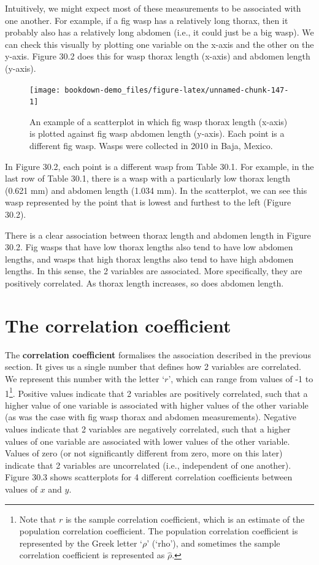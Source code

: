 \documentclass[
]{scrbook}
\begin{document}
Intuitively, we might expect most of these measurements to be associated with one another.
For example, if a fig wasp has a relatively long thorax, then it probably also has a relatively long abdomen (i.e., it could just be a big wasp).
We can check this visually by plotting one variable on the x-axis and the other on the y-axis.
Figure 30.2 does this for wasp thorax length (x-axis) and abdomen length (y-axis).

\begin{figure}
\texttt{[image: bookdown-demo\_files/figure-latex/unnamed-chunk-147-1]} \caption{An example of a scatterplot in which fig wasp thorax length (x-axis) is plotted against fig wasp abdomen length (y-axis). Each point is a different fig wasp. Wasps were collected in 2010 in Baja, Mexico.}\label{fig:unnamed-chunk-147}
\end{figure}

In Figure 30.2, each point is a different wasp from Table 30.1.
For example, in the last row of Table 30.1, there is a wasp with a particularly low thorax length (0.621 mm) and abdomen length (1.034 mm).
In the scatterplot, we can see this wasp represented by the point that is lowest and furthest to the left (Figure 30.2).

There is a clear association between thorax length and abdomen length in Figure 30.2.
Fig wasps that have low thorax lengths also tend to have low abdomen lengths, and wasps that high thorax lengths also tend to have high abdomen lengths.
In this sense, the 2 variables are associated.
More specifically, they are positively correlated.
As thorax length increases, so does abdomen length.

\hypertarget{the-correlation-coefficient}{%
\section{The correlation coefficient}\label{the-correlation-coefficient}}

The \textbf{correlation coefficient} formalises the association described in the previous section.
It gives us a single number that defines how 2 variables are correlated.
We represent this number with the letter `\(r\)', which can range from values of -1 to 1\footnote{Note that \(r\) is the sample correlation coefficient, which is an estimate of the population correlation coefficient. The population correlation coefficient is represented by the Greek letter `\(\rho\)' (`rho'), and sometimes the sample correlation coefficient is represented as \(\hat{\rho}\).}.
Positive values indicate that 2 variables are positively correlated, such that a higher value of one variable is associated with higher values of the other variable (as was the case with fig wasp thorax and abdomen measurements).
Negative values indicate that 2 variables are negatively correlated, such that a higher values of one variable are associated with lower values of the other variable.
Values of zero (or not significantly different from zero, more on this later) indicate that 2 variables are uncorrelated (i.e., independent of one another).
Figure 30.3 shows scatterplots for 4 different correlation coefficients between values of \(x\) and \(y\).
\end{document}
